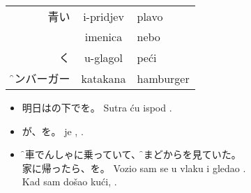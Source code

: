 \documentclass[pig]{grampig}
\begin{document}
	\begin{minipage}{\width}
		\onehalfspacing
%		
%		
%		
		
		\begin{table}
			\centering
			\textsc{} \br
			\begin{tabular}{RCl}
				青い & i-pridjev & plavo \\
				 & imenica & nebo \\
				く & u-glagol & peći \\
				\f{ハンバーガー}{\strut} & katakana & hamburger \\
			\end{tabular}
		\end{table} \vspace{-1em}
		
		\singlespacing
		\begin{itemize}
			\item 明日はの下でを。\bh
			Sutra ću ispod  . \\[-0.5em]
			
			\item {}が、を。\bh
			 je , . \\[-0.5em]
			
			\item {}\f{電車}{でんしゃ}に乗っていて、\f{窓}{まど}からを見ていた。\\
			家に帰ったら、を。\bh
			Vozio sam se u  vlaku i gledao . \\
			Kad sam došao kući, . 
		\end{itemize}　\vspace{-1.5em}
	
		\begin{center}
		\end{center}
	\end{minipage}
\end{document}
